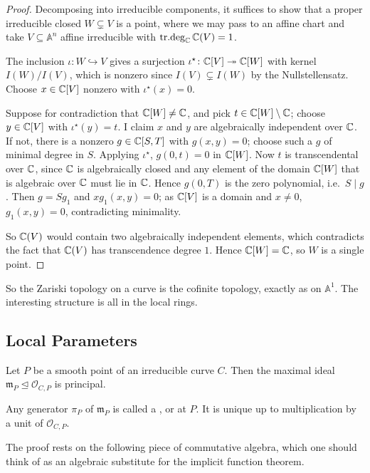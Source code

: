 \documentclass[a4paper]{scrartcl}
\newcommand{\A}{\mathbb{A}}
\newcommand{\mm}{\mathfrak{m}}
\newcommand{\Oh}{\mathcal{O}}
\DeclareMathOperator{\trdeg}{tr.deg}
\begin{document}
\begin{proof}
	Decomposing into irreducible components, it suffices to show that a proper irreducible closed $W \subsetneq V$ is a point, where we may pass to an affine chart and take $V \subseteq \A^n$ affine irreducible with $\trdeg_\C \C(V) = 1$.

	The inclusion $\iota \colon W \hookrightarrow V$ gives a surjection $\iota^\star \colon \mathbb{C}[V] \twoheadrightarrow \mathbb{C}[W]$ with kernel $I(W)/I(V)$, which is nonzero since $I(V) \subsetneq I(W)$ by the Nullstellensatz. Choose $x \in \mathbb{C}[V]$ nonzero with $\iota^\star(x) = 0$.

	Suppose for contradiction that $\mathbb{C}[W] \neq \mathbb{C}$, and pick $t \in \mathbb{C}[W]\setminus\mathbb{C}$; choose $y \in \mathbb{C}[V]$ with $\iota^\star(y) = t$. I claim $x$ and $y$ are algebraically independent over $\mathbb{C}$. If not, there is a nonzero $g \in \mathbb{C}[S,T]$ with $g(x,y) = 0$; choose such a $g$ of minimal degree in $S$. Applying $\iota^\star$, $g(0,t) = 0$ in $\mathbb{C}[W]$. Now $t$ is transcendental over $\mathbb{C}$, since $\mathbb{C}$ is algebraically closed and any element of the domain $\mathbb{C}[W]$ that is algebraic over $\mathbb{C}$ must lie in $\mathbb{C}$. Hence $g(0,T)$ is the zero polynomial, i.e.\ $S \mid g$. Then $g = Sg_1$ and $xg_1(x,y) = 0$; as $\mathbb{C}[V]$ is a domain and $x \neq 0$, $g_1(x,y) = 0$, contradicting minimality.

	So $\mathbb{C}(V)$ would contain two algebraically independent elements, which contradicts the fact that $\mathbb{C}(V)$ has transcendence degree $1$. Hence $\mathbb{C}[W] = \mathbb{C}$, so $W$ is a single point.
\end{proof}

So the Zariski topology on a curve is the cofinite topology, exactly as on $\A^1$. The interesting structure is all in the local rings.

\subsection{Local Parameters}

\begin{theorem}\label{thm:localparam}
	Let $P$ be a smooth point of an irreducible curve $C$. Then the maximal ideal $\mm_P \trianglelefteq \Oh_{C,P}$ is principal.
\end{theorem}

Any generator $\pi_P$ of $\mm_P$ is called a ,  or  at $P$. It is unique up to multiplication by a unit of $\Oh_{C,P}$.

The proof rests on the following piece of commutative algebra, which one should think of as an algebraic substitute for the implicit function theorem.
\end{document}
